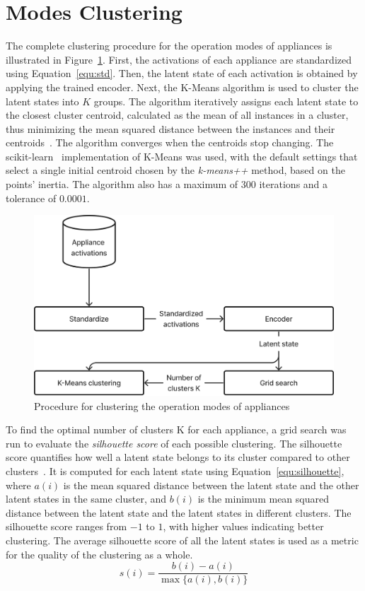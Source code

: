 \section{Modes Clustering}

The complete clustering procedure for the operation modes of appliances is illustrated in Figure~\ref{fig:clustering}. First, the activations of each appliance are standardized using Equation~\eqref{equ:std}. Then, the latent state of each activation is obtained by applying the trained encoder. Next, the K-Means algorithm is used to cluster the latent states into $K$ groups. The algorithm iteratively assigns each latent state to the closest cluster centroid, calculated as the mean of all instances in a cluster, thus minimizing the mean squared distance between the instances and their centroids~\parencite{lloydLeastSquaresQuantization1982}. The algorithm converges when the centroids stop changing. The scikit-learn~\parencite*{pedregosaScikitlearnMachineLearning2011, buitinckAPIDesignMachine2013} implementation of K-Means was used, with the default settings that select a single initial centroid chosen by the \textit{k-means++} method, based on the points’ inertia. The algorithm also has a maximum of $300$ iterations and a tolerance of $0.0001$.

\begin{figure}
  \centering
  \includegraphics[width=.55\linewidth]{images/modes_clustering/clustering.png}
  \caption{Procedure for clustering the operation modes of appliances}
  \label{fig:clustering}
\end{figure}

To find the optimal number of clusters K for each appliance, a grid search was run to evaluate the \textit{silhouette score} of each possible clustering. The silhouette score quantifies how well a latent state belongs to its cluster compared to other clusters~\parencite{rousseeuwSilhouettesGraphicalAid1987}. It is computed for each latent state using Equation~\eqref{equ:silhouette}, where $a(i)$ is the mean squared distance between the latent state and the other latent states in the same cluster, and $b(i)$ is the minimum mean squared distance between the latent state and the latent states in different clusters. The silhouette score ranges from $-1$ to $1$, with higher values indicating better clustering. The average silhouette score of all the latent states is used as a metric for the quality of the clustering as a whole.
\begin{equation}\label{equ:silhouette}
  s(i) = \frac{b(i) - a(i)}{\max{\{a(i), b(i)\}}}
\end{equation}

